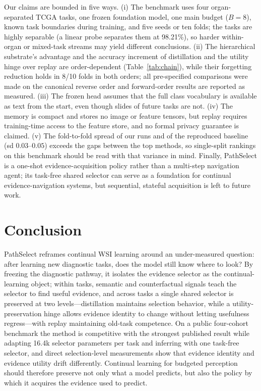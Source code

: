 \documentclass{article}
\begin{document}
Our claims are bounded in five ways. (i) The benchmark uses four organ-separated TCGA tasks, one frozen foundation model, one main budget ($B=8$), known task boundaries during training, and five seeds or ten folds; the tasks are highly separable (a linear probe separates them at 98.21\%), so harder within-organ or mixed-task streams may yield different conclusions. (ii) The hierarchical substrate's advantage and the accuracy increment of distillation and the utility hinge over replay are order-dependent (Table~\ref{tab:chain}), while their forgetting reduction holds in 8/10 folds in both orders; all pre-specified comparisons were made on the canonical reverse order and forward-order results are reported as measured. (iii) The frozen head assumes that the full class vocabulary is available as text from the start, even though slides of future tasks are not. (iv) The memory is compact and stores no image or feature tensors, but replay requires training-time access to the feature store, and no formal privacy guarantee is claimed. (v) The fold-to-fold spread of our runs and of the reproduced baseline (sd $0.03$--$0.05$) exceeds the gaps between the top methods, so single-split rankings on this benchmark should be read with that variance in mind. Finally, PathSelect is a one-shot evidence-acquisition policy rather than a multi-step navigation agent; its task-free shared selector can serve as a foundation for continual evidence-navigation systems, but sequential, stateful acquisition is left to future work.

\section{Conclusion}

PathSelect reframes continual WSI learning around an under-measured question: after learning new diagnostic tasks, does the model still know where to look? By freezing the diagnostic pathway, it isolates the evidence selector as the continual-learning object; within tasks, semantic and counterfactual signals teach the selector to find useful evidence, and across tasks a single shared selector is preserved at two levels---distillation maintains selection behavior, while a utility-preservation hinge allows evidence identity to change without letting usefulness regress---with replay maintaining old-task competence. On a public four-cohort benchmark the method is competitive with the strongest published result while adapting 16.4k selector parameters per task and inferring with one task-free selector, and direct selection-level measurements show that evidence identity and evidence utility drift differently. Continual learning for budgeted perception should therefore preserve not only what a model predicts, but also the policy by which it acquires the evidence used to predict.
\end{document}
